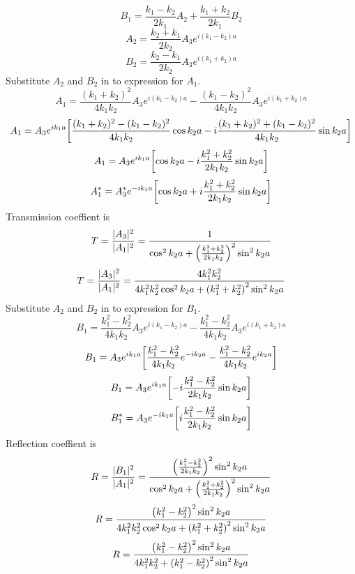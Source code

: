 \documentclass[12pt]{article}
\begin{document}
\[B_1=\frac{k_1-k_2}{2k_1}A_2+\frac{k_1+k_2}{2k_1}B_2\]
\[A_2=\frac{k_2+k_1}{2k_2}A_3e^{i(k_1-k_2)a}\]
\[B_2=\frac{k_2-k_1}{2k_2}A_3e^{i(k_1+k_2)a}\]
Substitute $A_2$ and $B_2$ in to expression for $A_1$.\\
\[A_1=\frac{(k_1+k_2)^2}{4k_1k_2}A_3e^{i(k_1-k_2)a}-\frac{(k_1-k_2)^2}{4k_1k_2}A_3e^{i(k_1+k_2)a}\]
\[A_1=A_3e^{ik_1a}\qty[\frac{(k_1+k_2)^2-(k_1-k_2)^2}{4k_1k_2}\cos k_2a-i\frac{(k_1+k_2)^2+(k_1-k_2)^2}{4k_1k_2}\sin k_2a]\]
\[A_1=A_3e^{ik_1a}\qty[\cos k_2a-i\frac{k^2_1+k^2_2}{2k_1k_2}\sin k_2a]\]
\[A_1^*=A_3^*e^{-ik_1a}\qty[\cos k_2a+i\frac{k^2_1+k^2_2}{2k_1k_2}\sin k_2a]\]
\newpage
Transmission coeffient is
\[T=\frac{|A_3|^2}{|A_1|^2}=\frac{1}{\cos^2 k_2a+\qty(\frac{k^2_1+k^2_2}{2k_1k_2})^2\sin^2 k_2a}\]
\[T=\frac{|A_3|^2}{|A_1|^2}=\frac{4k^2_1k^2_2}{4k^2_1k^2_2\cos^2 k_2a+\qty(k^2_1+k^2_2)^2\sin^2 k_2a}\]
Substitute $A_2$ and $B_2$ in to expression for $B_1$.\\
\[B_1=\frac{k^2_1-k^2_2}{4k_1k_2}A_3e^{i(k_1-k_2)a}-\frac{k^2_1-k^2_2}{4k_1k_2}A_3e^{i(k_1+k_2)a}\]
\[B_1=A_3e^{ik_1a}\qty[\frac{k^2_1-k^2_2}{4k_1k_2}e^{-ik_2a}-\frac{k^2_1-k^2_2}{4k_1k_2}e^{ik_2a}]\]
\[B_1=A_3e^{ik_1a}\qty[-i\frac{k^2_1-k^2_2}{2k_1k_2}\sin k_2a]\]
\[B_1^*=A_3e^{-ik_1a}\qty[i\frac{k^2_1-k^2_2}{2k_1k_2}\sin k_2a]\]
Reflection coeffient is
\[R=\frac{|B_1|^2}{|A_1|^2}=\frac{\qty(\frac{k^2_1-k^2_2}{2k_1k_2})^2\sin^2 k_2a}{\cos^2 k_2a+\qty(\frac{k^2_1+k^2_2}{2k_1k_2})^2\sin^2 k_2a}\]
\[R=\frac{\qty(k^2_1-k^2_2)^2\sin^2 k_2a}{4k_1^2k_2^2\cos^2 k_2a+\qty(k^2_1+k^2_2)^2\sin^2 k_2a}\]
\[R=\frac{\qty(k^2_1-k^2_2)^2\sin^2 k_2a}{4k_1^2k_2^2+\qty(k^2_1-k^2_2)^2\sin^2 k_2a}\]
\end{document}
